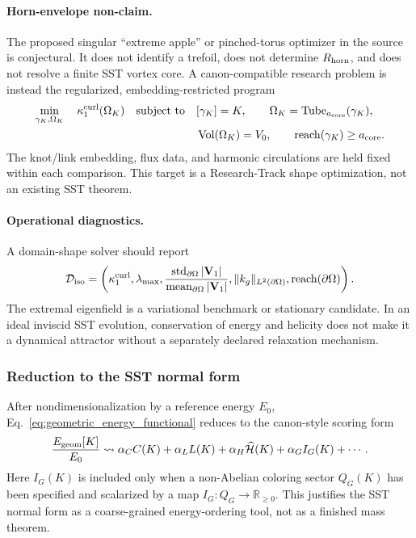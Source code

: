 \paragraph{Horn-envelope non-claim.}
The proposed singular ``extreme apple'' or pinched-torus optimizer in the
source is conjectural.  It does not identify a trefoil, does not determine
$R_{\rm horn}$, and does not resolve a finite SST vortex core.  A canon-compatible
research problem is instead the regularized, embedding-restricted program
\begin{align}
    \min_{\gamma_K,\Omega_K}
    \quad
    \kappa_{1}^{\rm curl}(\Omega_K)
    \quad\text{subject to}\quad
    &[\gamma_K]=K,
    \qquad
    \Omega_K=\operatorname{Tube}_{a_{\rm core}}(\gamma_K),\\
    &\operatorname{Vol}(\Omega_K)=V_0,
    \qquad
    \operatorname{reach}(\gamma_K)\ge a_{\rm core}.
    \label{eq:rt_isoperimetric_regularized_sst_target}
\end{align}
The knot/link embedding, flux data, and harmonic circulations are held fixed
within each comparison.  This target is a Research-Track shape optimization,
not an existing SST theorem.

\paragraph{Operational diagnostics.}
A domain-shape solver should report
\begin{align}
    \mathcal D_{\rm iso}
    =
    \left(
        \kappa_{1}^{\rm curl},
        \lambda_{\max},
        \frac{\operatorname{std}_{\partial\Omega}|\mathbf V_1|}
             {\operatorname{mean}_{\partial\Omega}|\mathbf V_1|},
        \|k_g\|_{L^2(\partial\Omega)},
        \operatorname{reach}(\partial\Omega)
    \right).
    \label{eq:rt_isoperimetric_diagnostics}
\end{align}
The extremal eigenfield is a variational benchmark or stationary candidate.
In an ideal inviscid SST evolution, conservation of energy and helicity does
not make it a dynamical attractor without a separately declared relaxation
mechanism.

\subsubsection{Reduction to the SST normal form}
After nondimensionalization by a reference energy $E_0$, Eq.~\eqref{eq:geometric_energy_functional} reduces to the canon-style scoring form
\begin{equation}
    \frac{E_{\rm geom}[K]}{E_0}
    \leadsto
    \alpha_C C(K)+\alpha_L L(K)+\alpha_H\widehat{\mathcal H}(K)+\alpha_G I_G(K)+\cdots.
    \label{eq:tfm_to_sst_eff}
\end{equation}
Here $I_G(K)$ is included only when a non-Abelian coloring sector $Q_G(K)$ has been specified and scalarized by a map $I_G:Q_G\to\mathbb R_{\ge0}$. This justifies the SST normal form as a coarse-grained energy-ordering tool, not as a finished mass theorem.

